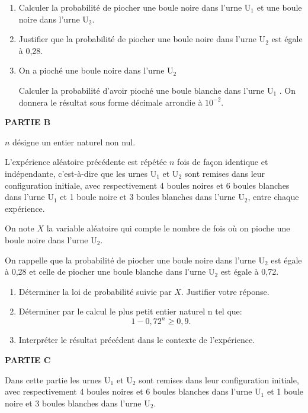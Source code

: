 \begin{enumerate}[start=2]
\item Calculer la probabilité de piocher une boule noire dans l'urne U$_1$ et une boule noire dans l'urne U$_2$.
\item Justifier que la probabilité de piocher une boule noire dans l'urne U$_2$ est égale à 0,28.
\item On a pioché une boule noire dans l'urne U$_2$

Calculer la probabilité d'avoir pioché une boule
blanche dans l'urne U$_1$ . On donnera le résultat sous forme décimale arrondie à $10^{-2}$.
\end{enumerate}

\medskip

\textbf{PARTIE B}

\medskip

$n$ désigne un entier naturel non nul.

L'expérience aléatoire précédente est répétée $n$ fois de façon identique et indépendante, c'est-à-dire que les urnes U$_1$ et U$_2$ sont remises dans leur configuration initiale, avec respectivement 4 boules noires et 6 boules blanches dans l'urne U$_1$ et 1 boule noire et 3 boules blanches dans l'urne U$_2$, entre chaque expérience.

On note $X$ la variable aléatoire qui compte le nombre de fois où on pioche une boule noire dans l'urne U$_2$.

On rappelle que la probabilité de piocher une boule noire dans l'urne U$_2$ est égale à 0,28 et celle de piocher une boule blanche dans l'urne U$_2$ est égale à 0,72.

\medskip

\begin{enumerate}
\item Déterminer la loi de probabilité suivie par $X$. Justifier votre réponse.
\item Déterminer par le calcul le plus petit entier naturel n tel que: 
\[1 - 0,72^n \geqslant 0,9.\]
\item Interpréter le résultat précédent dans le contexte de l'expérience.
\end{enumerate}

\medskip

\textbf{PARTIE C}

\medskip

Dans cette partie les urnes U$_1$ et U$_2$ sont remises dans leur configuration initiale, avec respectivement 4 boules noires et 6 boules blanches dans l'urne U$_1$ et 1 boule noire et 3 boules blanches dans l'urne U$_2$.


